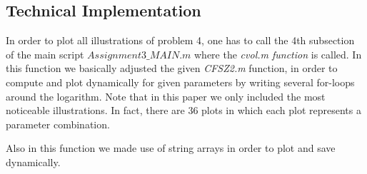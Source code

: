 \documentclass[a4paper,11pt]{article}
\begin{document}
\subsection{Technical Implementation}
In order to plot all illustrations of problem 4, one has to call the 4th subsection of the main script \textit{$Assignment3\_MAIN.m$} where the \textit{cvol.m function} is called.
In this function we basically adjusted the given \textit{CFSZ2.m} function, in order to compute and plot dynamically for given parameters by writing several for-loops around the logarithm. Note that in this paper we only included the most noticeable illustrations. In fact, there are 36 plots in which each plot represents a parameter combination.

Also in this function we made use of string arrays in order to plot and save dynamically.
\newpage
\end{document}

